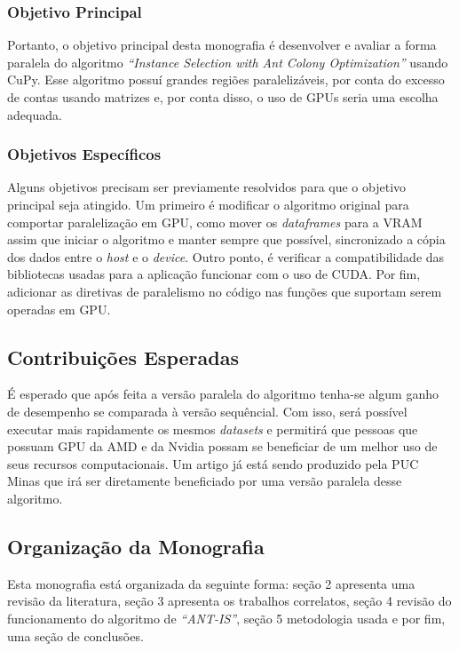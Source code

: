 \subsubsection{Objetivo Principal}

Portanto, o objetivo principal desta monografia é desenvolver e avaliar a forma paralela do algoritmo \emph{``Instance Selection with Ant Colony
Optimization''} usando {CuPy}. Esse algoritmo possuí grandes regiões paralelizáveis, por conta do excesso de
contas usando matrizes e, por conta disso, o uso de GPUs seria uma escolha adequada.


\subsubsection{Objetivos Específicos}
Alguns objetivos precisam ser previamente resolvidos para que o objetivo principal seja atingido. Um primeiro é modificar
o algoritmo original para comportar paralelização em GPU, como mover os \emph{dataframes} para a {VRAM} assim que
iniciar o algoritmo e manter sempre que possível, sincronizado a cópia dos dados entre o \emph{host} e o \emph{device}.
Outro ponto, é verificar a compatibilidade das bibliotecas usadas para a aplicação funcionar com o uso de {CUDA}.
Por fim, adicionar as diretivas de paralelismo no código nas funções que suportam serem operadas em GPU.

\subsection{Contribuições Esperadas}

É esperado que após feita a versão paralela do algoritmo tenha-se algum ganho de desempenho se comparada à versão
sequêncial. Com isso, será possível executar mais rapidamente os mesmos \emph{datasets} e permitirá que pessoas que
possuam GPU da AMD e da Nvidia possam se beneficiar de um melhor uso de seus recursos computacionais. Um artigo
já está sendo produzido pela PUC Minas que irá ser diretamente beneficiado por uma versão paralela desse algoritmo.

\subsection{Organização da Monografia}

Esta monografia está organizada da seguinte forma: seção 2 apresenta uma revisão da literatura,
seção 3 apresenta os trabalhos correlatos, seção 4 revisão do funcionamento do algoritmo de
\emph{``ANT-IS''}, seção 5 metodologia usada e por fim, uma seção de conclusões.
